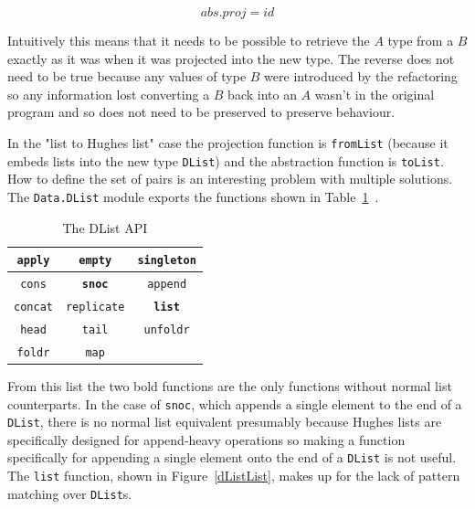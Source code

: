 \begin{figure}[t]
\begin{equation}\label{eq1}
abs . proj = id
\end{equation}
\end{figure}

Intuitively this means that it needs to be possible to retrieve the $A$ type from a $B$ exactly as it was when it was projected into the new type. The reverse does not need to be true because any values of type $B$ were introduced by the refactoring so any information lost converting a $B$ back into an $A$ wasn't in the original program and so does not need to be preserved to preserve behaviour.

In the "list to Hughes list" case the projection function is \texttt{fromList} (because it embeds lists into the new type \texttt{DList}) and the abstraction function is \texttt{toList}. How to define the set of pairs is an interesting problem with multiple solutions. The \texttt{Data.DList} module exports the  functions shown in Table~\ref{dlistApi}~\citep{dlist}.


\begin{table}
\begin{center}
\begin{tabular}{| c | c | c |}
  \hline
  \texttt{apply} & \texttt{empty} & \texttt{singleton}\\
  \hline
  \texttt{cons} & \textbf{\texttt{snoc}} & \texttt{append} \\
  \hline
  \texttt{concat} & \texttt{replicate} & \textbf{\texttt{list}}\\ 
  \hline	
  \texttt{head} & \texttt{tail} & \texttt{unfoldr}\\ 
  \hline  
  \texttt{foldr} & \texttt{map} & \\
  \hline
\end{tabular}
\end{center}
\caption{The DList API}
\label{dlistApi}
\end{table}


From this list the two bold functions are the only functions without normal list counterparts. In the case of \texttt{snoc}, which appends a single element to the end of a \texttt{DList}, there is no normal list equivalent presumably because Hughes lists are specifically designed for append-heavy operations so making a function specifically for appending a single element onto the end of a \texttt{DList} is not useful. The \texttt{list} function, shown in Figure~\ref{dListList}, makes up for the lack of pattern matching over \texttt{DList}s.

